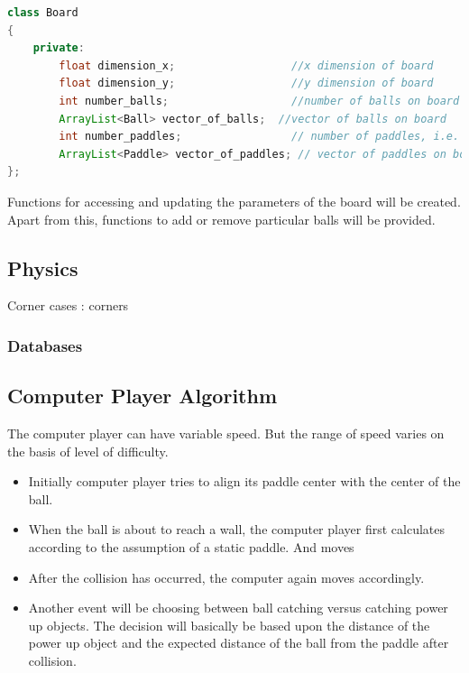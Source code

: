 \documentclass{article}
\begin{document}
\begin{lstlisting}[language=Java, caption={Class Parameters for Board}]
class Board
{
	private:
		float dimension_x;                  //x dimension of board
		float dimension_y;                  //y dimension of board
		int number_balls;                   //number of balls on board
		ArrayList<Ball> vector_of_balls;  //vector of balls on board
		int number_paddles;					// number of paddles, i.e. players
		ArrayList<Paddle> vector_of_paddles; // vector of paddles on board
};

\end{lstlisting}

Functions for accessing and updating the parameters of the board will be created. Apart from this, functions to add or remove particular balls will be provided.

			\subsection{Physics}
			Corner cases :  corners 
					\subsubsection{Databases}


			\subsection{Computer Player Algorithm}
			\par\noindent The computer player can have variable speed. But the range of speed varies on the basis of level of difficulty.

			\begin{itemize}
			\item Initially computer player tries to align its paddle center with the center of the ball.
			\item When the ball is about to reach a wall, the computer player first calculates according to the assumption of a static paddle. And moves
			\item After the collision has occurred, the computer again moves accordingly.
			\item Another event will be choosing between ball catching versus catching power up objects. The decision will basically be based upon the distance of the power up object and the expected distance of the ball from the paddle after collision.

			\end{itemize}
\end{document}
